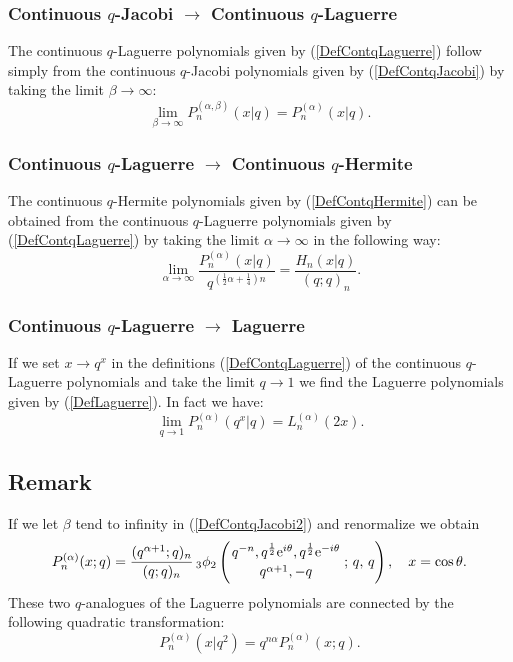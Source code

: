 \documentclass[envcountchap,graybox]{svmono}
\newcounter{rom}
\newcommand{\qhyp}[5]{\mbox{}_{#1}{\phi}_{#2}
\left(\genfrac{}{}{0pt}{}{#3}{#4}\,;\,q,\,#5\right)}
\newcommand{\e}{\textrm{e}}
\newcommand{\qhyp}[5]{\,\mbox{}_{#1}\phi_{#2}\!\left(
  \genfrac{}{}{0pt}{}{#3}{#4};#5\right)}
\begin{document}
{{\subsubsection*{Continuous $q$-Jacobi $\rightarrow$ Continuous $q$-Laguerre}
The continuous $q$-Laguerre polynomials given by (\ref{DefContqLaguerre})
follow simply from the continuous $q$-Jacobi polynomials given by (\ref{DefContqJacobi})
by taking the limit $\beta\rightarrow\infty$:
$$\lim _{\beta\rightarrow\infty} P_n^{(\alpha,\beta)}(x|q)=P_n^{(\alpha)}(x|q).$$

\subsubsection*{Continuous $q$-Laguerre $\rightarrow$ Continuous $q$-Hermite}
The continuous $q$-Hermite polynomials given by (\ref{DefContqHermite}) can
be obtained from the continuous $q$-Laguerre polynomials given by
(\ref{DefContqLaguerre}) by taking the limit $\alpha\rightarrow\infty$ in the
following way:
\begin{equation}
\lim_{\alpha\rightarrow\infty}
\frac{P_n^{(\alpha)}(x|q)}{q^{(\frac{1}{2}\alpha+\frac{1}{4})n}}
=\frac{H_n(x|q)}{(q;q)_n}.
\end{equation}

\subsubsection*{Continuous $q$-Laguerre $\rightarrow$ Laguerre}
If we set $x\rightarrow q^x$ in the definitions (\ref{DefContqLaguerre}) of the continuous
$q$-Laguerre polynomials and take the limit $q\rightarrow 1$ we find the Laguerre polynomials
given by (\ref{DefLaguerre}). In fact we have:
\begin{equation}
\lim_{q\rightarrow 1}P_n^{(\alpha)}(q^x|q)=L_n^{(\alpha)}(2x).
\end{equation}

\subsection*{Remark} If we let $\beta$ tend to infinity in (\ref{DefContqJacobi2})
and renormalize we obtain
\begin{equation}
\label{DefContqLaguerre2}
P_n^{(\alpha)}(x;q)=\frac{(q^{\alpha+1};q)_n}{(q;q)_n}\,\qhyp{3}{2}
{q^{-n},q^{\frac{1}{2}}\e^{i\theta},q^{\frac{1}{2}}\e^{-i\theta}}
{q^{\alpha+1},-q}{q},\quad x=\cos\theta.
\end{equation}
These two $q$-analogues of the Laguerre polynomials are connected by the
following quadratic transformation:
$$P_n^{(\alpha)}(x|q^2)=q^{n\alpha}P_n^{(\alpha)}(x;q).$$

}}
\end{document}
